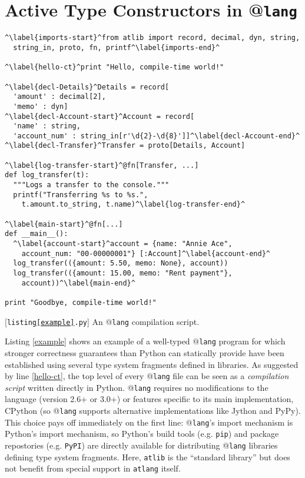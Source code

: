 \documentclass[9pt]{sigplanconf}
\newcommand{\lstinlinep}[1]{\lstinline[language=Python,basicstyle=\ttfamily\small,deletendkeywords={tuple,buffer,map}]{#1}}
\begin{document}
\section{Active Type Constructors in @\texttt{lang}}\label{usage}

\begin{codelisting}[t]
\begin{lstlisting}
^\label{imports-start}^from atlib import record, decimal, dyn, string, 
  string_in, proto, fn, printf^\label{imports-end}^

^\label{hello-ct}^print "Hello, compile-time world!"

^\label{decl-Details}^Details = record[
  'amount' : decimal[2], 
  'memo' : dyn]
^\label{decl-Account-start}^Account = record[
  'name' : string, 
  'account_num' : string_in[r'\d{2}-\d{8}']]^\label{decl-Account-end}^
^\label{decl-Transfer}^Transfer = proto[Details, Account]

^\label{log-transfer-start}^@fn[Transfer, ...]
def log_transfer(t):
  """Logs a transfer to the console."""
  printf("Transferring %s to %s.", 
    t.amount.to_string, t.name)^\label{log-transfer-end}^

^\label{main-start}^@fn[...]
def __main__():
  ^\label{account-start}^account = {name: "Annie Ace", 
    account_num: "00-00000001"} [:Account]^\label{account-end}^
  log_transfer(({amount: 5.50, memo: None}, account))
  log_transfer(({amount: 15.00, memo: "Rent payment"}, 
    account))^\label{main-end}^
  
print "Goodbye, compile-time world!"
\end{lstlisting}
\caption{[\texttt{listing\ref{example}.py}] An @\texttt{lang} compilation script.}
\label{example}
\end{codelisting}

%
Listing \ref{example} shows an example of a well-typed @\texttt{lang} program for which stronger correctness guarantees than Python can statically provide have been established using several type system fragments defined in libraries. As suggested by line \ref{hello-ct}, the top level of every @\texttt{lang} file can be seen as a \emph{compilation script} written directly in Python. @\texttt{lang} requires no modifications to the language (version 2.6+ or 3.0+) or features specific to its main implementation, CPython (so @\texttt{lang} supports alternative implementations like Jython and PyPy). This choice pays off immediately on the first line: @\texttt{lang}'s import mechanism is Python's import mechanism, so Python's build tools (e.g. \lstinlinep{pip}) and package repostories (e.g. \lstinlinep{PyPI}) are directly available for distributing @\texttt{lang} libraries defining type system fragments. Here, \lstinlinep{atlib} is the ``standard library'' but does not benefit from special support in \lstinlinep{atlang} itself.%
\end{document}
